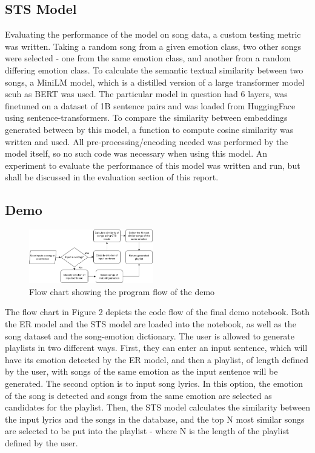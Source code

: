 \documentclass[11pt]{article}
\begin{document}
\subsection{STS Model}

Evaluating the performance of the model on song data, a custom testing metric was written. Taking a random song from a given emotion class, two other songs were selected - one from the same emotion class, and another from a random differing emotion class. 
To calculate the semantic textual similarity between two songs, a MiniLM \cite{minilm} model, which is a distilled version of a large transformer model scuh as BERT \cite{bert} was used. The particular model in question had 6 layers, was finetuned on a dataset of 1B sentence pairs and was loaded from HuggingFace \cite{stsmodel} using sentence-transformers. To compare the similarity between embeddings generated between by this model, a function to compute cosine similarity was written and used. All pre-processing/encoding needed was performed by the model itself, so no such code was necessary when using this model. 
An experiment to evaluate the performance of this model was written and run, but shall be discussed in the evaluation section of this report.

\subsection{Demo}
\begin{figure}[H]
    \centering
    \includegraphics[width=0.48\textwidth]{images/DemoFlow.png}
    \caption{Flow chart showing the program flow of the demo}
\end{figure}

The flow chart in Figure 2 depicts the code flow of the final demo notebook. Both the ER model and the STS model are loaded into the notebook, as well as the song dataset and the song-emotion dictionary. The user is allowed to generate playlists in two different ways. First, they can enter an input sentence, which will have its emotion detected by the ER model, and then a playlist, of length defined by the user, with songs of the same emotion as the input sentence will be generated. The second option is to input song lyrics. In this option, the emotion of the song is detected and songs from the same emotion are selected as candidates for the playlist. Then, the STS model calculates the similarity between the input lyrics and the songs in the database, and the top N most similar songs are selected to be put into the playlist - where N is the length of the playlist defined by the user.
\end{document}
